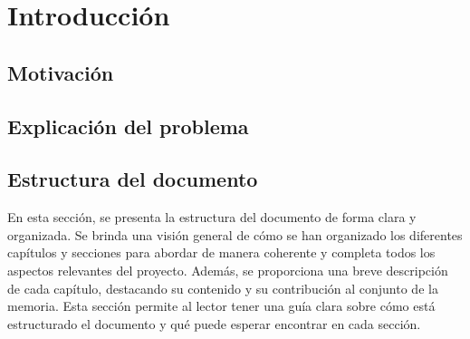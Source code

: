 \section{Introducción}

\subsection{Motivación}

\subsection{Explicación del problema}

\subsection{Estructura del documento}
En esta sección, se presenta la estructura del documento de forma clara y organizada. Se 
brinda una visión general de cómo se han organizado los diferentes capítulos y secciones 
para abordar de manera coherente y completa todos los aspectos relevantes del proyecto. 
Además, se proporciona una breve descripción de cada capítulo, destacando su contenido 
y su contribución al conjunto de la memoria. Esta sección permite al lector tener una 
guía clara sobre cómo está estructurado el documento y qué puede esperar encontrar en cada 
sección.

